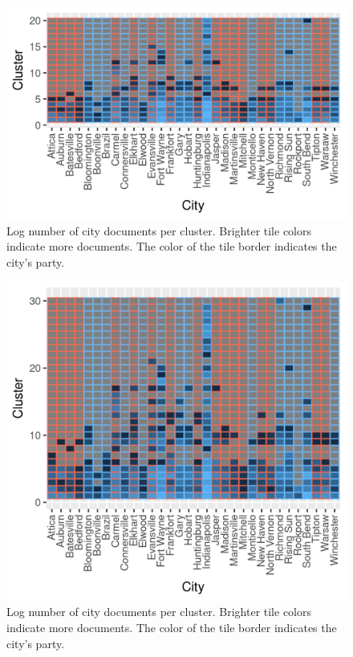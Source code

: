\documentclass[11pt]{article}
\begin{document}
\begin{figure}[!ht]
	\centering
	\caption{Log number of city documents per cluster. Brighter tile colors indicate more documents. The color of the tile border indicates the city's party.}
	\label{hclustCity20}
	\includegraphics[width=\linewidth]{figures/heatmap_hclust_20.png}
\end{figure}

\begin{figure}[!ht]
	\centering
	\caption{Log number of city documents per cluster. Brighter tile colors indicate more documents. The color of the tile border indicates the city's party.}
	\label{hclustCity30}
	\includegraphics[width=\linewidth]{figures/heatmap_hclust_30.png}
\end{figure}
\end{document}
